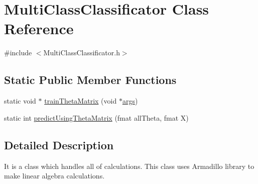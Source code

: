 \hypertarget{class_multi_class_classificator}{\section{Multi\-Class\-Classificator Class Reference}
\label{class_multi_class_classificator}
}


{\ttfamily \#include $<$Multi\-Class\-Classificator.\-h$>$}

\subsection*{Static Public Member Functions}
\begin{DoxyCompactItemize}
\item 
static void $\ast$ \hyperlink{class_multi_class_classificator_a4eda8cb5f03c85a12864b1d1eef59ff1}{train\-Theta\-Matrix} (void $\ast$\hyperlink{structargs}{args})
\item 
static int \hyperlink{class_multi_class_classificator_a8ad5aa7fd468ab871c422b2f84d02c88}{predict\-Using\-Theta\-Matrix} (fmat all\-Theta, fmat X)
\end{DoxyCompactItemize}


\subsection{Detailed Description}
It is a class which handles all of calculations. This class uses Armadillo library to make linear algebra calculations. 

